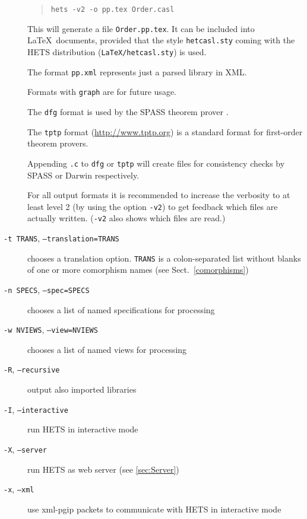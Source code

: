 \documentclass{article}
\newcommand{\normalTEXTSC}[2]{{#1\scriptsize#2}}
\newcommand     {\Hets}{\normalTEXTSC{H}{ETS}\xspace}
\newcommand     {\SPASS}{\normalTEXTSC{S}{PASS}\xspace}
\begin{document}
\begin{description}
\begin{quote}
\texttt{hets -v2 -o pp.tex Order.casl}
\end{quote}

This will generate a file \texttt{Order.pp.tex}. It can be included
into \LaTeX\ documents, provided that the style \texttt{hetcasl.sty}
coming with the \Hets distribution (\texttt{LaTeX/hetcasl.sty}) is used.

The format \texttt{pp.xml} represents just a parsed library in XML.

Formats with \texttt{graph} are for future usage.

The \texttt{dfg} format is used by the \SPASS theorem prover
\cite{WeidenbachEtAl02}.

The \texttt{tptp} format (\url{http://www.tptp.org}) is a standard
format for first-order theorem provers.

Appending \texttt{.c} to \texttt{dfg} or \texttt{tptp} will create files for
consistency checks by SPASS or Darwin respectively.

For all output formats it is recommended to increase the verbosity to at least
level 2 (by using the option \texttt{-v2}) to get feedback which files are
actually written. (\texttt{-v2} also shows which files are read.)

\item[\texttt{-t TRANS}, \texttt{--translation=TRANS}]
chooses a translation option. \texttt{TRANS} is a colon-separated list
without blanks of one or more comorphism names (see Sect.~\ref{comorphisms})

\item[\texttt{-n SPECS}, \texttt{--spec=SPECS}]
chooses a list of named specifications for processing

\item[\texttt{-w NVIEWS}, \texttt{--view=NVIEWS}]
chooses a list of named views for processing

\item[\texttt{-R}, \texttt{--recursive}] output also imported libraries

\item[\texttt{-I}, \texttt{--interactive}] run \Hets in interactive mode

\item[\texttt{-X}, \texttt{--server}] run \Hets as web server (see
  \ref{sec:Server})

\item[\texttt{-x}, \texttt{--xml}] use xml-pgip packets to communicate with
  \Hets in interactive mode


\end{description}
\end{document}
